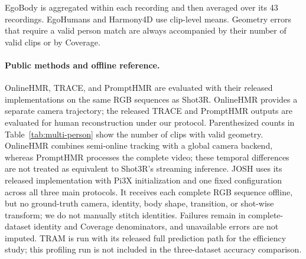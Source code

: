 EgoBody is aggregated within each recording and then averaged over its 43
recordings. EgoHumans and Harmony4D use clip-level means. Geometry errors that
require a valid person match are always accompanied by their number of valid
clips or by Coverage.

\paragraph{Public methods and offline reference.}
OnlineHMR, TRACE, and PromptHMR are evaluated with their released
implementations on the same RGB sequences as Shot3R. OnlineHMR provides a
separate camera trajectory; the released TRACE and PromptHMR outputs are
evaluated for human reconstruction under our protocol. Parenthesized counts
in Table~\ref{tab:multi-person} show the number of clips with valid geometry.
OnlineHMR combines semi-online tracking with a global camera backend, whereas
PromptHMR processes the complete video; these temporal differences are not
treated as equivalent to Shot3R's streaming inference. JOSH uses its released
implementation with Pi3X initialization and one fixed configuration across all three
main protocols. It receives each complete RGB sequence offline, but no
ground-truth camera, identity, body shape, transition, or shot-wise transform;
we do not manually stitch identities. Failures remain in complete-dataset
identity and Coverage denominators, and unavailable errors are not imputed.
TRAM is run with its released full prediction path for the efficiency study;
this profiling run is not included in the three-dataset accuracy comparison.


